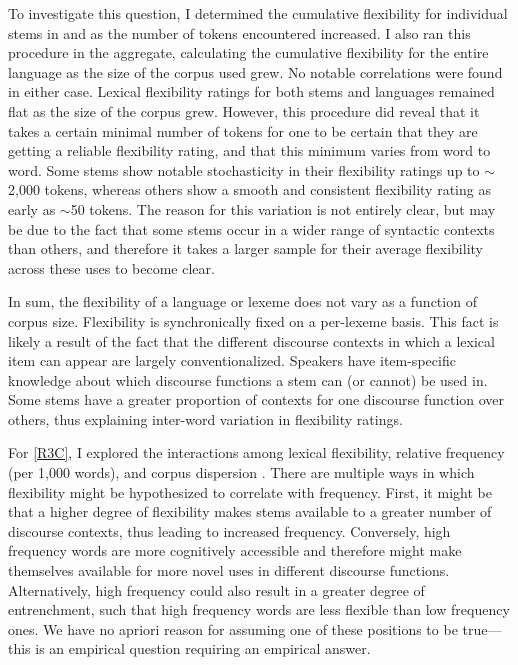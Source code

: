 To investigate this question, I determined the cumulative flexibility for individual stems in  and  as the number of tokens encountered increased. I also ran this procedure in the aggregate, calculating the cumulative flexibility for the entire language as the size of the corpus used grew. No notable correlations were found in either case. Lexical flexibility ratings for both stems and languages remained flat as the size of the corpus grew. However, this procedure did reveal that it takes a certain minimal number of tokens for one to be certain that they are getting a reliable flexibility rating, and that this minimum varies from word to word. Some stems show notable stochasticity in their flexibility ratings up to $\sim$2,000 tokens, whereas others show a smooth and consistent flexibility rating as early as $\sim$50 tokens. The reason for this variation is not entirely clear, but may be due to the fact that some stems occur in a wider range of syntactic contexts than others, and therefore it takes a larger sample for their average flexibility across these uses to become clear.

In sum, the flexibility of a language or lexeme does not vary as a function of corpus size. Flexibility is synchronically fixed on a per-lexeme basis. This fact is likely a result of the fact that the different discourse contexts in which a lexical item can appear are largely conventionalized. Speakers have item-specific knowledge about which discourse functions a stem can (or cannot) be used in. Some stems have a greater proportion of contexts for one discourse function over others, thus explaining inter-word variation in flexibility ratings.

For \ref{R3C}, I explored the interactions among lexical flexibility, relative frequency (per 1,000 words), and corpus dispersion . There are multiple ways in which flexibility might be hypothesized to correlate with frequency. First, it might be that a higher degree of flexibility makes stems available to a greater number of discourse contexts, thus leading to increased frequency. Conversely, high frequency words are more cognitively accessible and therefore might make themselves available for more novel uses in different discourse functions. Alternatively, high frequency could also result in a greater degree of entrenchment, such that high frequency words are less flexible than low frequency ones. We have no apriori reason for assuming one of these positions to be true—this is an empirical question requiring an empirical answer.

